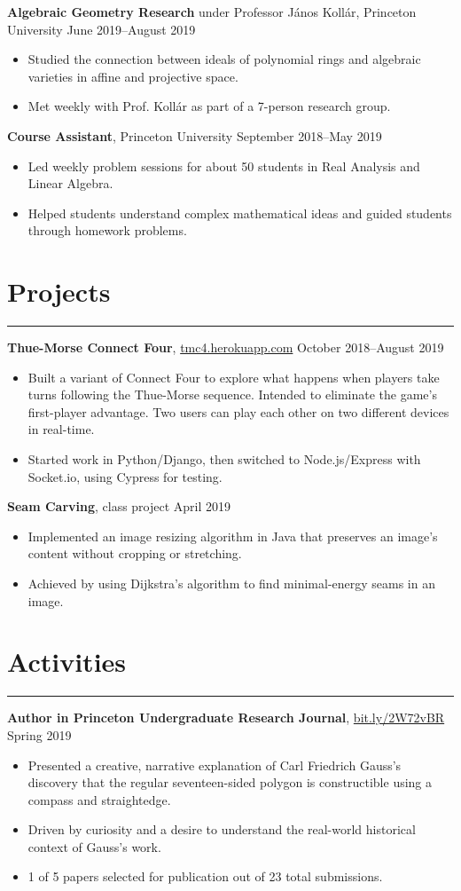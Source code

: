\documentclass[10pt]{article}
\newcommand{\resumesection}[1]{\vspace{-0.2cm}\section*{#1}\vspace{-0.2cm}\hrule\vspace{0.2cm}}
\begin{document}
\textbf{Algebraic Geometry Research} under Professor J\'{a}nos Koll\'{a}r, Princeton University \hfill June 2019--August 2019
\begin{itemize}
	\item Studied the connection between ideals of polynomial rings and algebraic varieties in affine and projective space.
	\item Met weekly with Prof. Koll\'{a}r as part of a 7-person research group.
\end{itemize}

\textbf{Course Assistant}, Princeton University \hfill September 2018--May 2019
\begin{itemize}
	\item Led weekly problem sessions for about 50 students in Real Analysis and Linear Algebra.
	\item Helped students understand complex mathematical ideas and guided students through homework problems.
\end{itemize}

\resumesection{Projects}

\textbf{Thue-Morse Connect Four}, \href{https://tmc4.herokuapp.com}{tmc4.herokuapp.com}  \hfill October 2018--August 2019
\begin{itemize}
	\item Built a variant of Connect Four to explore what happens when players take turns following the Thue-Morse sequence. Intended to eliminate the game's first-player advantage. Two users can play each other on two different devices in real-time.
	\item Started work in Python/Django, then switched to Node.js/Express with Socket.io, using Cypress for testing.
\end{itemize}

\textbf{Seam Carving}, class project \hfill April 2019
\begin{itemize}
	\item Implemented an image resizing algorithm in Java that preserves an image's content without cropping or stretching.
	\item Achieved by using Dijkstra's algorithm to find minimal-energy seams in an image.
\end{itemize}

\resumesection{Activities}

\textbf{Author in Princeton Undergraduate Research Journal}, \href{https://bit.ly/2W72vBR}{bit.ly/2W72vBR} \hfill Spring 2019
\begin{itemize}
	\item Presented a creative, narrative explanation of Carl Friedrich Gauss's discovery that the regular seventeen-sided polygon is constructible using a compass and straightedge.
	\item Driven by curiosity and a desire to understand the real-world historical context of Gauss's work.
	\item 1 of 5 papers selected for publication out of 23 total submissions.
\end{itemize}
\end{document}
